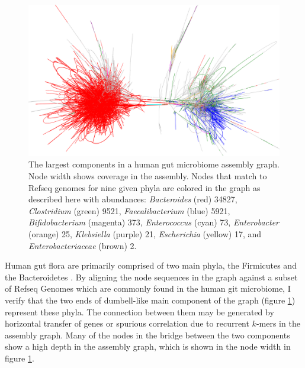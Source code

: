 \begin{figure}[htbp!]
  \centering
  \includegraphics[width=1.0\textwidth]{Chapter3/Figs/human_gut_microbiome_phyla_colored_full_between.png}
  \caption[A human gut microbiome]{
    The largest components in a human gut microbiome assembly graph.
    Node width shows coverage in the assembly.
    Nodes that match to Refseq genomes for nine given phyla are colored in the graph as described here with abundances: \emph{Bacteroides} (red) 34827, \emph{Clostridium} (green) 9521, \emph{Faecalibacterium} (blue) 5921, \emph{Bifidobacterium} (magenta) 373, \emph{Enterococcus} (cyan) 73, \emph{Enterobacter} (orange) 25, \emph{Klebsiella} (purple) 21, \emph{Escherichia} (yellow) 17, and \emph{Enterobacteriaceae} (brown) 2.
  }
  \label{fig:human_gut_microbiome_bandage}
\end{figure}


Human gut flora are primarily comprised of two main phyla, the Firmicutes and the Bacteroidetes \cite{mahowald2009characterizing}.
By aligning the node sequences in the graph against a subset of Refseq Genomes which are commonly found in the human git microbiome, I verify that the two ends of dumbell-like main component of the graph (figure \ref{fig:human_gut_microbiome_bandage}) represent these phyla.
The connection between them may be generated by horizontal transfer of genes or spurious correlation due to recurrent $k$-mers in the assembly graph.
Many of the nodes in the bridge between the two components show a high depth in the assembly graph, which is shown in the node width in figure \ref{fig:human_gut_microbiome_bandage}.

